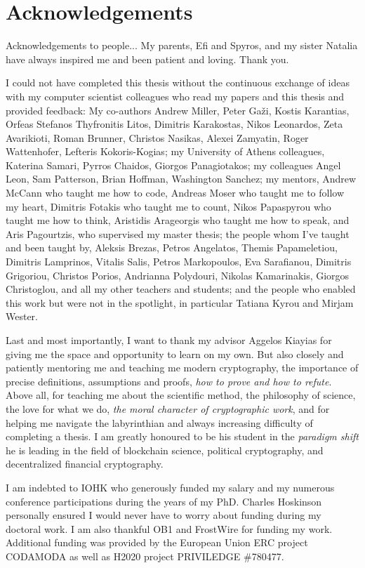 \section*{Acknowledgements}
\ifdraft
Acknowledgements to people...
\else
My parents, Efi and Spyros, and my sister Natalia have always inspired me and
been patient and loving. Thank you.

I could not have completed this thesis without the continuous exchange of ideas
with my computer scientist colleagues who read my papers and this thesis and
provided feedback: My co-authors Andrew Miller, Peter Ga\v{z}i, Kostis
Karantias, Orfeas Stefanos Thyfronitis Litos, Dimitris Karakostas, Nikos
Leonardos, Zeta Avarikioti, Roman Brunner, Christos Nasikas,  Alexei Zamyatin,
Roger Wattenhofer, Lefteris Kokoris-Kogias; my University of Athens colleagues,
Katerina Samari, Pyrros Chaidos, Giorgos Panagiotakos; my colleagues Angel Leon,
Sam Patterson, Brian Hoffman, Washington Sanchez; my mentors, Andrew McCann who
taught me how to code, Andreas Moser who taught me to follow my heart, Dimitris
Fotakis who taught me to count, Nikos Papaspyrou who taught me how to think,
Aristidis Arageorgis who taught me how to speak, and Aris Pagourtzis, who
supervised my master thesis; the people whom I've taught and been taught by,
Aleksis Brezas, Petros Angelatos, Themis Papameletiou, Dimitris Lamprinos,
Vitalis Salis, Petros Markopoulos, Eva Sarafianou, Dimitris Grigoriou, Christos
Porios, Andrianna Polydouri, Nikolas Kamarinakis, Giorgos Christoglou, and all
my other teachers and students; and the people who enabled this work but were
not in the spotlight, in particular Tatiana Kyrou and Mirjam Wester.

Last and most importantly, I want to thank my advisor Aggelos Kiayias for
giving me the space and opportunity to learn on my own. But also closely and
patiently mentoring me and teaching me modern cryptography, the importance of
precise definitions, assumptions and proofs, \emph{how to prove and how to
refute}. Above all, for teaching me about the scientific method, the philosophy
of science, the love for what we do, \emph{the moral character of
cryptographic work}, and for helping me navigate the labyrinthian and
always increasing difficulty of completing a thesis. I am greatly
honoured to be his student in the \emph{paradigm shift} he is leading in the
field of blockchain science, political cryptography, and decentralized financial
cryptography.
\fi

I am indebted to IOHK who generously funded my salary and my numerous conference
participations during the years of my PhD. Charles Hoskinson personally ensured
I would never have to worry about funding during my doctoral work. I am also
thankful OB1 and FrostWire for funding my work. Additional funding was provided
by the European Union ERC project CODAMODA as well as H2020 project PRIVILEDGE
\#780477.
